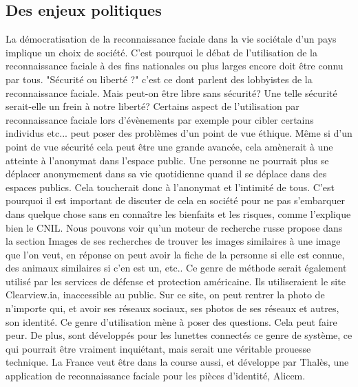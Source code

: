\documentclass[12pt,french]{article}
\theoremstyle{plain}
\theoremstyle{definition}
\begin{document}
\subsection{Des enjeux politiques}
La démocratisation de la reconnaissance faciale dans la vie sociétale d'un pays implique un choix de société. C'est pourquoi le débat de l'utilisation de la reconnaissance faciale à des fins nationales ou plus larges encore doit être connu par tous. "Sécurité ou liberté ?" c'est ce dont parlent des lobbyistes de la reconnaissance faciale. Mais peut-on être libre sans sécurité? Une telle sécurité serait-elle un frein à notre liberté?
Certains aspect de l'utilisation par reconnaissance faciale lors d'évènements par exemple pour cibler certains individus etc... peut poser des problèmes d'un point de vue éthique.
Même si d'un point de vue sécurité cela peut être une grande avancée, cela amènerait à une atteinte à l'anonymat dans l'espace public. Une personne ne pourrait plus se déplacer anonymement dans sa vie quotidienne quand il se déplace dans des espaces publics. Cela toucherait donc à l'anonymat et l'intimité de tous. C'est pourquoi il est important de discuter de cela en société pour ne pas s'embarquer dans quelque chose sans en connaître les bienfaits et les risques, comme l'explique bien le CNIL.
Nous pouvons voir qu'un moteur de recherche russe propose dans la section Images de ses recherches de trouver les images similaires à une image que l'on veut, en réponse on peut avoir la fiche de la personne si elle est connue, des animaux similaires si c'en est un, etc..
Ce genre de méthode serait également utilisé par les services de défense et protection américaine. Ils utiliseraient le site Clearview.ia, inaccessible au public. Sur ce site, on peut rentrer la photo de n'importe qui, et avoir ses réseaux sociaux, ses photos de ses réseaux et autres, son identité. Ce genre d'utilisation mène à poser des questions. Cela peut faire peur. De plus, sont développés pour les lunettes connectés ce genre de système, ce qui pourrait être vraiment inquiétant, mais serait une véritable prouesse technique.
La France veut être dans la course aussi, et développe par Thalès, une application de reconnaissance faciale pour les pièces d'identité, Alicem.
\end{document}
